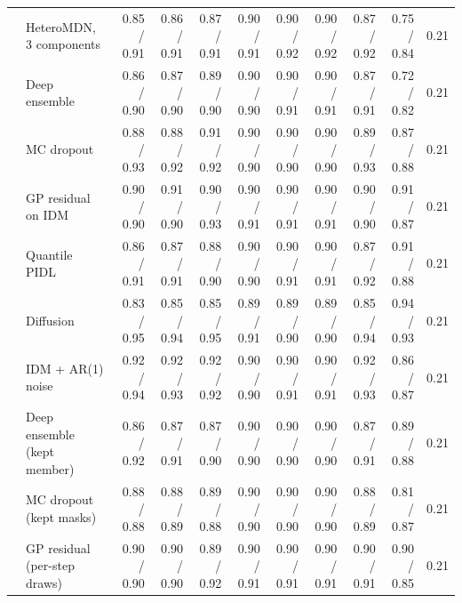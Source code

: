 \begin{table}[htbp]
\begin{tabular}{llrrrrrrrrr}
 & HeteroMDN, 3 components & 0.85 / 0.91 & 0.86 / 0.91 & 0.87 / 0.91 & 0.90 / 0.91 & 0.90 / 0.92 & 0.90 / 0.92 & 0.87 / 0.92 & 0.75 / 0.84 & 0.21 \\
 & Deep ensemble & 0.86 / 0.90 & 0.87 / 0.90 & 0.89 / 0.90 & 0.90 / 0.90 & 0.90 / 0.91 & 0.90 / 0.91 & 0.87 / 0.91 & 0.72 / 0.82 & 0.21 \\
 & MC dropout & 0.88 / 0.93 & 0.88 / 0.92 & 0.91 / 0.92 & 0.90 / 0.90 & 0.90 / 0.90 & 0.90 / 0.90 & 0.89 / 0.93 & 0.87 / 0.88 & 0.21 \\
 & GP residual on IDM & 0.90 / 0.90 & 0.91 / 0.90 & 0.90 / 0.93 & 0.90 / 0.91 & 0.90 / 0.91 & 0.90 / 0.91 & 0.90 / 0.90 & 0.91 / 0.87 & 0.21 \\
 & Quantile PIDL & 0.86 / 0.91 & 0.87 / 0.91 & 0.88 / 0.90 & 0.90 / 0.90 & 0.90 / 0.91 & 0.90 / 0.91 & 0.87 / 0.92 & 0.91 / 0.88 & 0.21 \\
 & Diffusion & 0.83 / 0.95 & 0.85 / 0.94 & 0.85 / 0.95 & 0.89 / 0.91 & 0.89 / 0.90 & 0.89 / 0.90 & 0.85 / 0.94 & 0.94 / 0.93 & 0.21 \\
 & IDM + AR(1) noise & 0.92 / 0.94 & 0.92 / 0.93 & 0.92 / 0.92 & 0.90 / 0.90 & 0.90 / 0.91 & 0.90 / 0.91 & 0.92 / 0.93 & 0.86 / 0.87 & 0.21 \\
 & Deep ensemble (kept member) & 0.86 / 0.92 & 0.87 / 0.91 & 0.87 / 0.90 & 0.90 / 0.90 & 0.90 / 0.90 & 0.90 / 0.90 & 0.87 / 0.91 & 0.89 / 0.88 & 0.21 \\
 & MC dropout (kept masks) & 0.88 / 0.88 & 0.88 / 0.89 & 0.89 / 0.88 & 0.90 / 0.90 & 0.90 / 0.90 & 0.90 / 0.90 & 0.88 / 0.89 & 0.81 / 0.87 & 0.21 \\
 & GP residual (per-step draws) & 0.90 / 0.90 & 0.90 / 0.90 & 0.89 / 0.92 & 0.90 / 0.91 & 0.90 / 0.91 & 0.90 / 0.91 & 0.90 / 0.91 & 0.90 / 0.85 & 0.21 \\
\bottomrule
\end{tabular}
\end{table}
